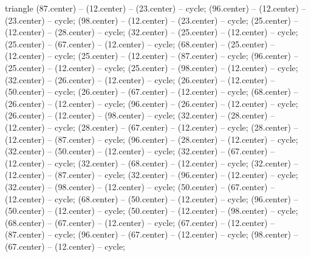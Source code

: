 \begin{pgfonlayer}{triangle}
 (87.center) -- (12.center) -- (23.center) -- cycle; 
 (96.center) -- (12.center) -- (23.center) -- cycle; 
 (98.center) -- (12.center) -- (23.center) -- cycle; 
 (25.center) -- (12.center) -- (28.center) -- cycle; 
 (32.center) -- (25.center) -- (12.center) -- cycle; 
 (25.center) -- (67.center) -- (12.center) -- cycle; 
 (68.center) -- (25.center) -- (12.center) -- cycle; 
 (25.center) -- (12.center) -- (87.center) -- cycle; 
 (96.center) -- (25.center) -- (12.center) -- cycle; 
 (25.center) -- (98.center) -- (12.center) -- cycle; 
 (32.center) -- (26.center) -- (12.center) -- cycle; 
 (26.center) -- (12.center) -- (50.center) -- cycle; 
 (26.center) -- (67.center) -- (12.center) -- cycle; 
 (68.center) -- (26.center) -- (12.center) -- cycle; 
 (96.center) -- (26.center) -- (12.center) -- cycle; 
 (26.center) -- (12.center) -- (98.center) -- cycle; 
 (32.center) -- (28.center) -- (12.center) -- cycle; 
 (28.center) -- (67.center) -- (12.center) -- cycle; 
 (28.center) -- (12.center) -- (87.center) -- cycle; 
 (96.center) -- (28.center) -- (12.center) -- cycle; 
 (32.center) -- (50.center) -- (12.center) -- cycle; 
 (32.center) -- (67.center) -- (12.center) -- cycle; 
 (32.center) -- (68.center) -- (12.center) -- cycle; 
 (32.center) -- (12.center) -- (87.center) -- cycle; 
 (32.center) -- (96.center) -- (12.center) -- cycle; 
 (32.center) -- (98.center) -- (12.center) -- cycle; 
 (50.center) -- (67.center) -- (12.center) -- cycle; 
 (68.center) -- (50.center) -- (12.center) -- cycle; 
 (96.center) -- (50.center) -- (12.center) -- cycle; 
 (50.center) -- (12.center) -- (98.center) -- cycle; 
 (68.center) -- (67.center) -- (12.center) -- cycle; 
 (67.center) -- (12.center) -- (87.center) -- cycle; 
 (96.center) -- (67.center) -- (12.center) -- cycle; 
 (98.center) -- (67.center) -- (12.center) -- cycle; 

\end{pgfonlayer}
